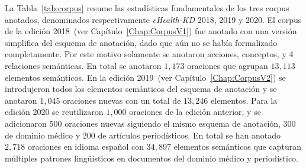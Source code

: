 La Tabla~\ref{tab:corpus} resume las estadísticas fundamentales de los tres corpus anotados, denominados
respectivamente \textit{eHealth-KD} 2018, 2019 y 2020.
El corpus de la edición 2018~(ver Capítulo~\ref{Chap:CorpusV1}) fue anotado con una versión simplifica del esquema de anotación, dado que aún no se había formalizado completamente. Por este motivo solamente se anotaron acciones, conceptos, y 4 relaciones semánticas. En total se anotaron $1,173$ oraciones que agrupan $13,113$ elementos semánticos.
En la edición 2019~(ver Capítulo~\ref{Chap:CorpusV2}) se introdujeron todos los elementos semánticos del esquema de anotación y se anotaron $1,045$ oraciones nuevas con un total de $13,246$ elementos.
Para la edición 2020 se reutilizaron $1,000$ oraciones de la edición anterior, y se adicionaron $500$ oraciones nuevas siguiendo el mismo esquema de anotación, $300$ de dominio médico y $200$ de artículos periodísticos.
En total se han anotado $2,718$ oraciones en idioma español con $34,897$ elementos semánticos que capturan múltiples patrones lingüísticos en documentos del dominio médico y periodístico.

